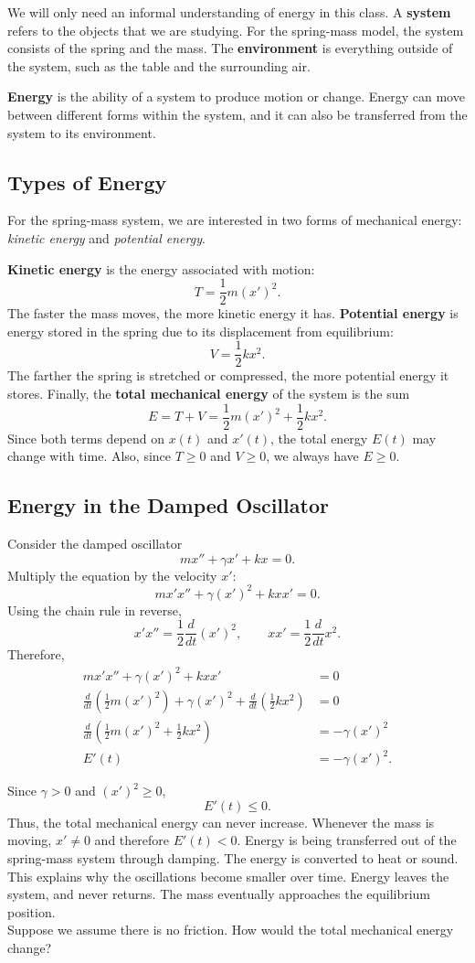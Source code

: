 \documentclass[11pt,letterpaper]{article}
\begin{document}
We will only need an informal understanding of energy in this class. A \textbf{system} refers to the objects that we are studying. For the spring-mass model, the system consists of the spring and the mass. The \textbf{environment} is everything outside of the system, such as the table and the surrounding air.

\textbf{Energy} is the ability of a system to produce motion or change. Energy can move between different forms within the system, and it can also be transferred from the system to its environment.

\subsection{Types of Energy}

For the spring-mass system, we are interested in two forms of mechanical energy: \textit{kinetic energy} and \textit{potential energy}.

\textbf{Kinetic energy} is the energy associated with motion:
\[
T=\frac12 m(x')^2.
\]
The faster the mass moves, the more kinetic energy it has. \textbf{Potential energy} is energy stored in the spring due to its displacement from equilibrium:
\[
V=\frac12 kx^2.
\]
The farther the spring is stretched or compressed, the more potential energy it stores. Finally, the \textbf{total mechanical energy} of the system is the sum
\[
E=T+V
  =\frac12 m(x')^2+\frac12 kx^2.
\]
Since both terms depend on $x(t)$ and $x'(t)$, the total energy $E(t)$ may change with time. Also, since $T\geq0$ and $V\geq0$, we always have $E\geq0$.

\subsection{Energy in the Damped Oscillator}

Consider the damped oscillator
\[
mx''+\gamma x'+kx=0.
\]
Multiply the equation by the velocity $x'$:
\[
mx'x''+\gamma(x')^2+kxx'=0.
\]
Using the chain rule in reverse,
\[
x'x''=\frac12\frac{d}{dt}(x')^2,
\qquad
xx'=\frac12\frac{d}{dt}x^2.
\]
Therefore,
\begin{align*}
mx'x''+\gamma(x')^2+kxx'&=0\\
\frac{d}{dt}\left(\frac12m(x')^2\right)
+\gamma(x')^2
+\frac{d}{dt}\left(\frac12kx^2\right)&=0\\
\frac{d}{dt}\left(
\frac12m(x')^2+\frac12kx^2
\right)&=-\gamma(x')^2\\
E'(t)&=-\gamma(x')^2.
\end{align*}

Since $\gamma>0$ and $(x')^2\geq0$,
\[
E'(t)\leq0.
\]
Thus, the total mechanical energy can never increase. Whenever the mass is moving, $x'\neq0$ and therefore $E'(t)<0$. Energy is being transferred out of the spring-mass system through damping. The energy is converted to heat or sound. This explains why the oscillations become smaller over time. Energy leaves the system, and never returns. The mass eventually approaches the equilibrium position. \\

\noindent Suppose we assume there is no friction. How would the total mechanical energy change?
\end{document}
